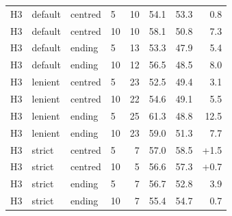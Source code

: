 \begin{tabular}{llllrrrr}
H3 & default & centred & 5 & 10 & 54.1 & 53.3 & \textminus{}0.8 \\
H3 & default & centred & 10 & 10 & 58.1 & 50.8 & \textminus{}7.3 \\
H3 & default & ending & 5 & 13 & 53.3 & 47.9 & \textminus{}5.4 \\
H3 & default & ending & 10 & 12 & 56.5 & 48.5 & \textminus{}8.0 \\
H3 & lenient & centred & 5 & 23 & 52.5 & 49.4 & \textminus{}3.1 \\
H3 & lenient & centred & 10 & 22 & 54.6 & 49.1 & \textminus{}5.5 \\
H3 & lenient & ending & 5 & 25 & 61.3 & 48.8 & \textminus{}12.5 \\
H3 & lenient & ending & 10 & 23 & 59.0 & 51.3 & \textminus{}7.7 \\
H3 & strict & centred & 5 & 7 & 57.0 & 58.5 & +1.5 \\
H3 & strict & centred & 10 & 5 & 56.6 & 57.3 & +0.7 \\
H3 & strict & ending & 5 & 7 & 56.7 & 52.8 & \textminus{}3.9 \\
H3 & strict & ending & 10 & 7 & 55.4 & 54.7 & \textminus{}0.7 \\
\bottomrule
\end{tabular}
